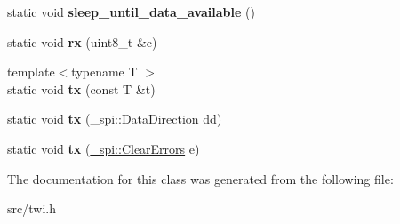 \begin{DoxyCompactItemize}
\item 
static void {\bfseries sleep\+\_\+until\+\_\+data\+\_\+available} ()\hypertarget{classTwiMaster_a608be7ffc6b33c6b11da50f9f665f650}{}\label{classTwiMaster_a608be7ffc6b33c6b11da50f9f665f650}

\item 
static void {\bfseries rx} (uint8\+\_\+t \&c)\hypertarget{classTwiMaster_a6da3c235f05a261b995914b239a6014e}{}\label{classTwiMaster_a6da3c235f05a261b995914b239a6014e}

\item 
{\footnotesize template$<$typename T $>$ }\\static void {\bfseries tx} (const T \&t)\hypertarget{classTwiMaster_ae84b9159bf0d1b92309b52530e66719b}{}\label{classTwiMaster_ae84b9159bf0d1b92309b52530e66719b}

\item 
static void {\bfseries tx} (\+\_\+spi\+::\+Data\+Direction dd)\hypertarget{classTwiMaster_a82f5505751ac58f5b69f16256352e06a}{}\label{classTwiMaster_a82f5505751ac58f5b69f16256352e06a}

\item 
static void {\bfseries tx} (\hyperlink{class__transmission_1_1ClearErrors}{\+\_\+spi\+::\+Clear\+Errors} e)\hypertarget{classTwiMaster_a8faae53ff4d560d547027cffa9f09b85}{}\label{classTwiMaster_a8faae53ff4d560d547027cffa9f09b85}

\end{DoxyCompactItemize}


The documentation for this class was generated from the following file\+:\begin{DoxyCompactItemize}
\item 
src/twi.\+h\end{DoxyCompactItemize}
